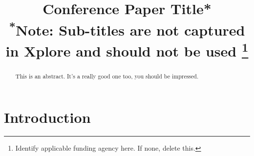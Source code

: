 \documentclass[conference]{IEEEtran}
\begin{document}
\title{Conference Paper Title*\\
{\footnotesize \textsuperscript{*}Note: Sub-titles are not captured in Xplore and
should not be used}
\thanks{Identify applicable funding agency here. If none, delete this.}
}

\author{
\and
{}
}

\maketitle

\begin{abstract}
This is an abstract. It's a really good one too, you should be impressed.
\end{abstract}

\begin{IEEEkeywords}

\end{IEEEkeywords}

\section{Introduction}
\end{document}
